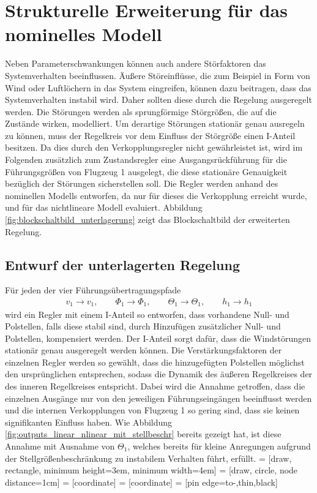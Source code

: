 \section{Strukturelle Erweiterung für das nominelles Modell}
Neben Parameterschwankungen können auch andere Störfaktoren das Systemverhalten beeinflussen. Äußere Störeinflüsse, die zum Beispiel in Form von Wind oder Luftlöchern in das System eingreifen, können dazu beitragen, dass das Systemverhalten instabil wird. Daher sollten diese durch die Regelung ausgeregelt werden. Die Störungen werden als sprungförmige Störgrößen, die auf die Zustände wirken, modelliert. Um derartige Störungen stationär genau ausregeln zu können, muss der Regelkreis vor dem Einfluss der Störgröße einen I-Anteil besitzen. Da dies durch den Verkopplungsregler nicht gewährleistet ist, wird im Folgenden zusätzlich zum Zustandsregler eine Ausgangsrückführung für die Führungsgrößen von Flugzeug 1 ausgelegt, die diese stationäre Genauigkeit bezüglich der Störungen sicherstellen soll. Die Regler werden anhand des nominellen Modells entworfen, da nur für dieses die Verkopplung erreicht wurde, und für das nichtlineare Modell evaluiert. Abbildung \ref{fig:blockschaltbild_unterlagerung} zeigt das Blockschaltbild der erweiterten Regelung.
 
\subsection{Entwurf der unterlagerten Regelung}
Für jeden der vier Führungsübertragungspfade 
\begin{align*}
	v_1 \rightarrow v_1, \qquad \Phi_1 \rightarrow \Phi_1, \qquad \Theta_1 \rightarrow \Theta_1, \qquad h_1 \rightarrow h_1 
\end{align*}
wird ein Regler mit einem I-Anteil so entworfen, dass vorhandene Null- und Polstellen, falls diese stabil sind, durch Hinzufügen zusätzlicher Null- und Polstellen, kompensiert werden. Der I-Anteil sorgt dafür, dass die Windstörungen stationär genau ausgeregelt werden können. Die Verstärkungsfaktoren der einzelnen Regler werden so gewählt, dass die hinzugefügten Polstellen möglichst den ursprünglichen entsprechen, sodass die Dynamik des äußeren Regelkreises der des inneren Regelkreises entspricht. Dabei wird die Annahme getroffen, dass die einzelnen Ausgänge nur von den jeweiligen Führungseingängen beeinflusst werden und die internen Verkopplungen von Flugzeug 1 so gering sind, dass sie keinen signifikanten Einfluss haben. Wie Abbildung \ref{fig:outputs_linear_nlinear_mit_stellbeschr} bereits gezeigt hat, ist diese Annahme mit Ausnahme von $\Theta_1$, welches bereits für kleine Anregungen aufgrund der Stellgrößenbeschränkung zu instabilem Verhalten führt, erfüllt.
 = [draw, rectangle, 
minimum height=3em, minimum width=4em]
 = [draw, circle, node distance=1cm]
 = [coordinate]
 = [coordinate]
 = [pin edge={to-,thin,black}]

